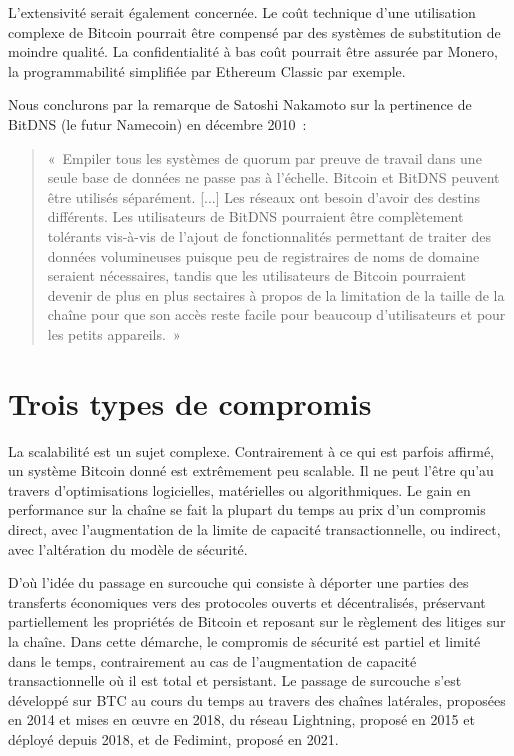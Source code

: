L'extensivité serait également concernée. Le coût technique d'une utilisation complexe de Bitcoin pourrait être compensé par des systèmes de substitution de moindre qualité. La confidentialité à bas coût pourrait être assurée par Monero, la programmabilité simplifiée par Ethereum Classic par exemple.

Nous conclurons par la remarque de Satoshi Nakamoto sur la pertinence de BitDNS (le futur Namecoin) en décembre 2010~:

\begin{quote}
«~Empiler tous les systèmes de quorum par preuve de travail dans une seule base de données ne passe pas à l'échelle. Bitcoin et BitDNS peuvent être utilisés séparément. [...] Les réseaux ont besoin d'avoir des destins différents. Les utilisateurs de BitDNS pourraient être complètement tolérants vis-à-vis de l'ajout de fonctionnalités permettant de traiter des données volumineuses puisque peu de registraires de noms de domaine seraient nécessaires, tandis que les utilisateurs de Bitcoin pourraient devenir de plus en plus sectaires à propos de la limitation de la taille de la chaîne pour que son accès reste facile pour beaucoup d'utilisateurs et pour les petits appareils.~»
\end{quote}

\section*{Trois types de compromis}

La scalabilité est un sujet complexe. Contrairement à ce qui est parfois affirmé, un système Bitcoin donné est extrêmement peu scalable. Il ne peut l'être qu'au travers d'optimisations logicielles, matérielles ou algorithmiques. Le gain en performance sur la chaîne se fait la plupart du temps au prix d'un compromis direct, avec l'augmentation de la limite de capacité transactionnelle, ou indirect, avec l'altération du modèle de sécurité.

D'où l'idée du passage en surcouche qui consiste à déporter une parties des transferts économiques vers des protocoles ouverts et décentralisés, préservant partiellement les propriétés de Bitcoin et reposant sur le règlement des litiges sur la chaîne. Dans cette démarche, le compromis de sécurité est partiel et limité dans le temps, contrairement au cas de l'augmentation de capacité transactionnelle où il est total et persistant. Le passage de surcouche s'est développé sur BTC au cours du temps au travers des chaînes latérales, proposées en 2014 et mises en œuvre en 2018, du réseau Lightning, proposé en 2015 et déployé depuis 2018, et de Fedimint, proposé en 2021.

